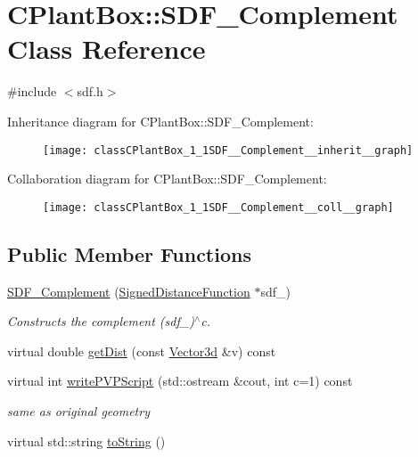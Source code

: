 \hypertarget{classCPlantBox_1_1SDF__Complement}{}\section{C\+Plant\+Box\+:\+:S\+D\+F\+\_\+\+Complement Class Reference}
\label{classCPlantBox_1_1SDF__Complement}


{\ttfamily \#include $<$sdf.\+h$>$}



Inheritance diagram for C\+Plant\+Box\+:\+:S\+D\+F\+\_\+\+Complement\+:\nopagebreak
\begin{figure}[H]
\begin{center}
\leavevmode
\texttt{[image: classCPlantBox\_1\_1SDF\_\_Complement\_\_inherit\_\_graph]}
\end{center}
\end{figure}


Collaboration diagram for C\+Plant\+Box\+:\+:S\+D\+F\+\_\+\+Complement\+:\nopagebreak
\begin{figure}[H]
\begin{center}
\leavevmode
\texttt{[image: classCPlantBox\_1\_1SDF\_\_Complement\_\_coll\_\_graph]}
\end{center}
\end{figure}
\subsection*{Public Member Functions}
\begin{DoxyCompactItemize}
\item 
\mbox{\label{classCPlantBox_1_1SDF__Complement_ab1c13cd9041d3f31429febf6d991d11d}} 
\hyperlink{classCPlantBox_1_1SDF__Complement_ab1c13cd9041d3f31429febf6d991d11d}{S\+D\+F\+\_\+\+Complement} (\hyperlink{classCPlantBox_1_1SignedDistanceFunction}{Signed\+Distance\+Function} $\ast$sdf\+\_\+)
\begin{DoxyCompactList}\small\item\em Constructs the complement (sdf\+\_\+)$^\wedge$c. \end{DoxyCompactList}\item 
virtual double \hyperlink{classCPlantBox_1_1SDF__Complement_a1f4d756f312a7ea6b208396a5a72e6a9}{get\+Dist} (const \hyperlink{classCPlantBox_1_1Vector3d}{Vector3d} \&v) const
\item 
\mbox{\label{classCPlantBox_1_1SDF__Complement_a9409020aca8bc34c969f5808fe5ffb9a}} 
virtual int \hyperlink{classCPlantBox_1_1SDF__Complement_a9409020aca8bc34c969f5808fe5ffb9a}{write\+P\+V\+P\+Script} (std\+::ostream \&cout, int c=1) const
\begin{DoxyCompactList}\small\item\em same as original geometry \end{DoxyCompactList}\item 
virtual std\+::string \hyperlink{classCPlantBox_1_1SDF__Complement_a8950e40cf4d3d81877205b4051186135}{to\+String} ()
\end{DoxyCompactItemize}


